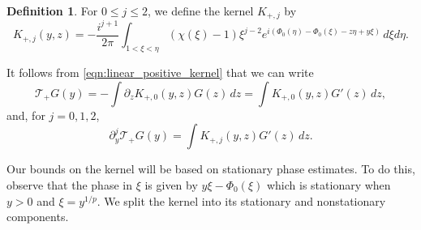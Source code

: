 \documentclass[11pt]{amsart}
\theoremstyle{definition}
\newtheorem{definition}[theorem]{Definition}
\theoremstyle{remark}
\numberwithin{equation}{section}
\newcommand{\mc}[1]{\mathcal{#1}}
\begin{document}
\begin{definition}
    For $0 \leq j \leq 2$, we define the kernel $K_{+,j}$ by
    \begin{equation}\label{eqn:linear_positive_kernel}K_{+,j}(y, z) = -\frac{i^{j+1}}{2\pi}\int_{1 < \xi < \eta}(\chi(\xi) - 1)\xi^{j - 2} e^{i(\Phi_0(\eta) - \Phi_0(\xi) - z\eta + y\xi)} \, d\xi d\eta.\end{equation}
\end{definition}

It follows from \eqref{eqn:linear_positive_kernel} that we can write 
\[\mc{T}_{+}G(y) = -\int \partial_zK_{+,0}(y, z) G(z)\,dz = \int K_{+,0}(y, z) G'(z)\,dz,\]
and, for $j=0,1,2$,
\begin{equation}\label{eqn:linear_positive_kernel_representation}\partial_y^j\mc{T}_{+}G(y) = \int K_{+,j}(y,z)G'(z)\,dz.\end{equation}

Our bounds on the kernel will be based on stationary phase estimates. To do this, observe that the phase in $\xi$ is given by $y\xi - \Phi_0(\xi)$ which is stationary when $y > 0$ and $\xi = y^{1/p}$. We split the kernel into its stationary and nonstationary components. 
\end{document}
